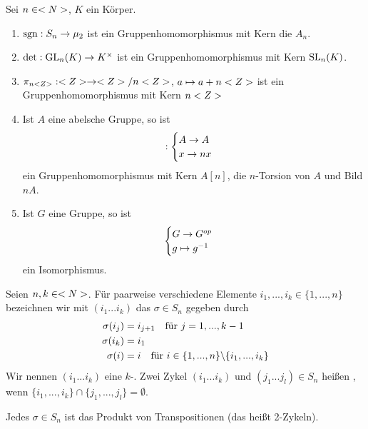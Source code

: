 \begin{example}
	Sei $n\in<N>$, $K$ ein Körper.
	\begin{enumerate}[label=(\alph*)]
		\item $\operatorname{sgn}:S_n\to\mu_2$ ist ein Gruppenhomomorphismus mit Kern die  $A_n$.
		\item $\det:\operatorname{GL}_n(K)\to K^\times$ ist ein Gruppenhomomorphismus mit Kern $\operatorname{SL}_n(K)$.
		\item $\pi_{n<Z>}:<Z>\to<Z>/n<Z>$, $a\mapsto a+n<Z>$ ist ein Gruppenhomomorphismus mit Kern $n<Z>$
		\item Ist $A$ eine abelsche Gruppe, so ist
		\begin{align}
			[n]:\begin{cases}
				A\to A \\ x\to nx
			\end{cases}\notag
		\end{align}
		ein Gruppenhomomorphismus mit Kern $A[n]$, die $n$-Torsion von $A$ und Bild $nA$.
		\item Ist $G$ eine Gruppe, so ist
		\begin{align}
			\begin{cases}
				G\to G^{op} \\ g\mapsto g^{-1}
			\end{cases}\notag
		\end{align}
		ein Isomorphismus.
	\end{enumerate}
\end{example}

\begin{definition}
	Seien $n,k\in<N>$. Für paarweise verschiedene Elemente $i_1,...,i_k\in\{1,...,n\}$ bezeichnen wir mit $(i_1...i_k)$ das $\sigma\in S_n$ gegeben durch
	\begin{align}
		\sigma(i_j) &= i_{j+1} \quad \text{für } j=1,...,k-1 \notag \\
		\sigma(i_k) &= i_1 \notag \\
		\sigma(i) &= i \quad \text{für } i\in\{1,...,n\}\backslash\{i_1,...,i_k\}\notag
	\end{align}
	Wir nennen $(i_1...i_k)$ eine $k$-. Zwei Zykel $(i_1...i_k)$ und $(j_1...j_l)\in S_n$ heißen , wenn $\{i_1,...,i_k\}\cap\{j_1,...,j_l\}=\emptyset$.
\end{definition}

\begin{proposition}
	Jedes $\sigma\in S_n$ ist das Produkt von Transpositionen (das heißt 2-Zykeln).
\end{proposition}

